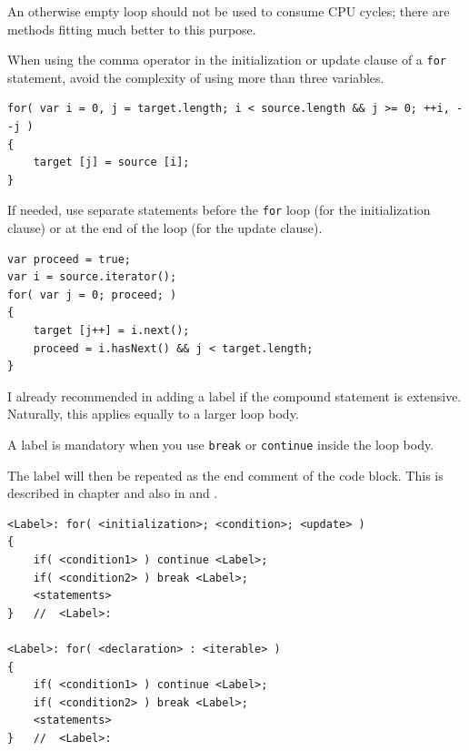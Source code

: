 An otherwise empty loop should not be used to consume CPU cycles; there are methods fitting much better to this purpose.

When using the comma operator in the initialization or update clause of a \lstinline|for| statement, avoid the complexity of using more than three variables. 

\begin{lstlisting}
for( var i = 0, j = target.length; i < source.length && j >= 0; ++i, --j )
{
    target [j] = source [i];
}
\end{lstlisting}

If needed, use separate statements before the \lstinline|for| loop (for the initialization clause) or at the end of the loop (for the update clause).

\begin{lstlisting}
var proceed = true;
var i = source.iterator();
for( var j = 0; proceed; )
{
    target [j++] = i.next();
    proceed = i.hasNext() && j < target.length;
}
\end{lstlisting}

I already recommended in  adding a label if the compound statement is extensive. Naturally, this applies equally to a larger loop body.

A label is mandatory when you use \lstinline|break| or \lstinline|continue| inside the loop body. 

The label will then be repeated as the end comment of the code block. This is described in chapter  and also in   and .
\begin{lstlisting}
<Label>: for( <initialization>; <condition>; <update> )
{
    if( <condition1> ) continue <Label>;
    if( <condition2> ) break <Label>;
    <statements>
}   //  <Label>:

<Label>: for( <declaration> : <iterable> )
{
    if( <condition1> ) continue <Label>;
    if( <condition2> ) break <Label>;
    <statements>
}   //  <Label>:
\end{lstlisting}

